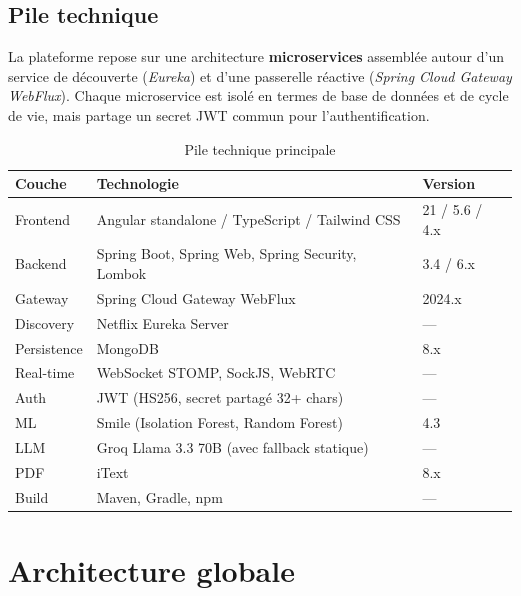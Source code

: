 \documentclass[11pt,a4paper]{report}
\begin{document}
\section{Pile technique}

La plateforme repose sur une architecture \textbf{microservices} assemblée autour
d'un service de découverte (\textit{Eureka}) et d'une passerelle réactive
(\textit{Spring Cloud Gateway WebFlux}). Chaque microservice est isolé en termes
de base de données et de cycle de vie, mais partage un secret JWT commun pour
l'authentification.

\begin{table}[h]
\centering
\begin{tabular}{lll}
\toprule
\textbf{Couche} & \textbf{Technologie} & \textbf{Version} \\
\midrule
Frontend     & Angular standalone / TypeScript / Tailwind CSS  & 21 / 5.6 / 4.x \\
Backend      & Spring Boot, Spring Web, Spring Security, Lombok & 3.4 / 6.x \\
Gateway      & Spring Cloud Gateway WebFlux                     & 2024.x \\
Discovery    & Netflix Eureka Server                            & — \\
Persistence  & MongoDB                                          & 8.x \\
Real-time    & WebSocket STOMP, SockJS, WebRTC                  & — \\
Auth         & JWT (HS256, secret partagé 32+ chars)            & — \\
ML           & Smile (Isolation Forest, Random Forest)          & 4.3 \\
LLM          & Groq Llama 3.3 70B (avec fallback statique)      & — \\
PDF          & iText                                            & 8.x \\
Build        & Maven, Gradle, npm                               & — \\
\bottomrule
\end{tabular}
\caption{Pile technique principale}
\end{table}


\chapter{Architecture globale}
\end{document}
